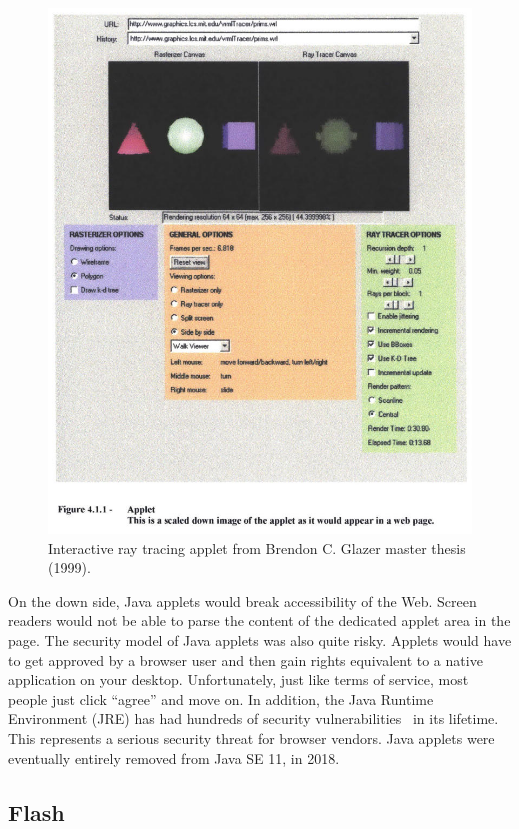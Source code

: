 \begin{figure}[h!]
	\centering
	\includegraphics[width=\linewidth]{assets/img/glazer-thesis.jpg}
	\caption{Interactive ray tracing applet from Brendon C. Glazer master thesis (1999).}%
	\label{fig:glazer-thesis}
\end{figure}

On the down side, Java applets would break accessibility of the Web.
Screen readers would not be able to parse the content of the dedicated
applet area in the page.
The security model of Java applets was also quite risky.
Applets would have to get approved by a browser user and then gain rights
equivalent to a native application on your desktop.
Unfortunately, just like terms of service, most people just click ``agree''
and move on.
In addition, the Java Runtime Environment (JRE) has had hundreds of security
vulnerabilities~\cite{JreCve} in its lifetime.
This represents a serious security threat for browser vendors.
Java applets were eventually entirely removed from Java SE 11, in 2018.

\subsection{Flash}%
\label{sub:Flash}

